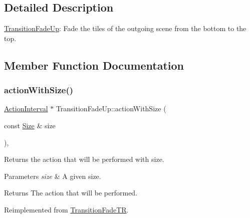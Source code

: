 \subsection{Detailed Description}
\hyperlink{classTransitionFadeUp}{Transition\+Fade\+Up}\+: Fade the tiles of the outgoing scene from the bottom to the top. 

\subsection{Member Function Documentation}
\mbox{\label{classTransitionFadeUp_a431d43ddd9acbf1854404a036063080e}} 
\subsubsection{\texorpdfstring{action\+With\+Size()}{actionWithSize()}\hspace{0.1cm}{\footnotesize\ttfamily [1/2]}}
{\footnotesize\ttfamily \hyperlink{classActionInterval}{Action\+Interval} $\ast$ Transition\+Fade\+Up\+::action\+With\+Size (\begin{DoxyParamCaption}\item[{const \hyperlink{classSize}{Size} \&}]{size }\end{DoxyParamCaption})\hspace{0.3cm}{\ttfamily [override]}, {\ttfamily [virtual]}}

Returns the action that will be performed with size.


\begin{DoxyParams}{Parameters}
{\em size} & A given size. \\
\hline
\end{DoxyParams}
\begin{DoxyReturn}{Returns}
The action that will be performed. 
\end{DoxyReturn}


Reimplemented from \hyperlink{classTransitionFadeTR_a371a39553335050a845c6743d20aac00}{Transition\+Fade\+TR}.

\mbox{\label{classTransitionFadeUp_a3657902d0401d39788d7c15a2b8485e1}} 
